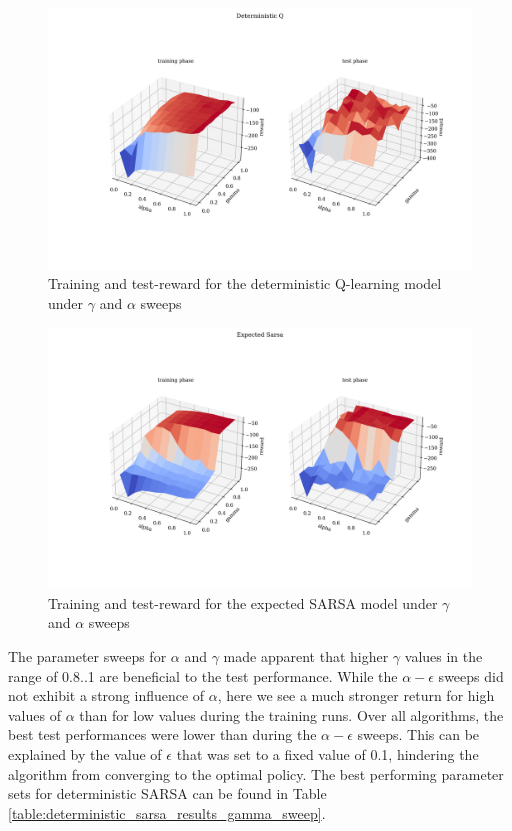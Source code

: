 \begin{figure}[H]
    \centering
    \includegraphics[width=1\linewidth]{../plots/det_Q_alpha_gamma.png}  
    \caption{Training and test-reward for the deterministic Q-learning model under $\gamma$ and $\alpha$ sweeps}
    \label{fig:det_Q_alpha_gamma}
\end{figure}




\begin{figure}[H]
    \centering
    \includegraphics[width=1\linewidth]{../plots/expected_sarsa_alpha_gamma.png}  
    \caption{Training and test-reward for the expected SARSA model under $\gamma$ and $\alpha$ sweeps}
    \label{fig:exp_sarsa_alpha_gamma}
\end{figure}



The parameter sweeps for $\alpha$ and $\gamma$ made apparent that higher $\gamma$ values in the range of 0.8..1 are beneficial to the test performance. While the $\alpha - \epsilon$ sweeps did not exhibit a strong influence of $\alpha$, here we see a much stronger return for high values of $\alpha$ than for low values during the training runs. Over all algorithms, the best test performances were lower than during the $\alpha - \epsilon$ sweeps. This can be explained by the value of $\epsilon$ that was set to a fixed value of 0.1, hindering the algorithm from converging to the optimal policy. The best performing parameter sets for deterministic SARSA can be found in Table \ref{table:deterministic_sarsa_results_gamma_sweep}.


